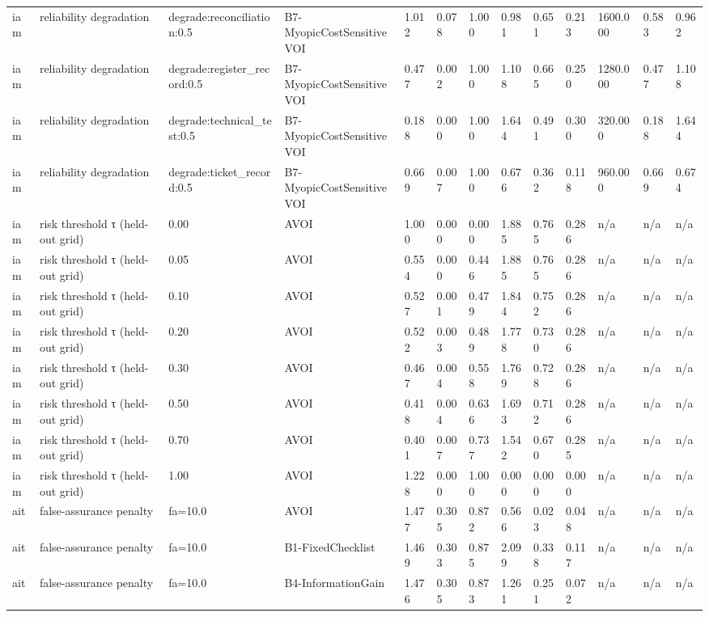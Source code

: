 \begin{table}[!ht]
{\begin{tabular}{lllllllllllll}
iam & reliability degradation & degrade:reconciliation:0.5 & B7-MyopicCostSensitiveVOI & 1.012 & 0.078 & 1.000 & 0.981 & 0.651 & 0.213 & 1600.000 & 0.583 & 0.962 \\
iam & reliability degradation & degrade:register\_record:0.5 & B7-MyopicCostSensitiveVOI & 0.477 & 0.002 & 1.000 & 1.108 & 0.665 & 0.250 & 1280.000 & 0.477 & 1.108 \\
iam & reliability degradation & degrade:technical\_test:0.5 & B7-MyopicCostSensitiveVOI & 0.188 & 0.000 & 1.000 & 1.644 & 0.491 & 0.300 & 320.000 & 0.188 & 1.644 \\
iam & reliability degradation & degrade:ticket\_record:0.5 & B7-MyopicCostSensitiveVOI & 0.669 & 0.007 & 1.000 & 0.676 & 0.362 & 0.118 & 960.000 & 0.669 & 0.674 \\
iam & risk threshold τ (held-out grid) & 0.00 & AVOI & 1.000 & 0.000 & 0.000 & 1.885 & 0.765 & 0.286 & n/a & n/a & n/a \\
iam & risk threshold τ (held-out grid) & 0.05 & AVOI & 0.554 & 0.000 & 0.446 & 1.885 & 0.765 & 0.286 & n/a & n/a & n/a \\
iam & risk threshold τ (held-out grid) & 0.10 & AVOI & 0.527 & 0.001 & 0.479 & 1.844 & 0.752 & 0.286 & n/a & n/a & n/a \\
iam & risk threshold τ (held-out grid) & 0.20 & AVOI & 0.522 & 0.003 & 0.489 & 1.778 & 0.730 & 0.286 & n/a & n/a & n/a \\
iam & risk threshold τ (held-out grid) & 0.30 & AVOI & 0.467 & 0.004 & 0.558 & 1.769 & 0.728 & 0.286 & n/a & n/a & n/a \\
iam & risk threshold τ (held-out grid) & 0.50 & AVOI & 0.418 & 0.004 & 0.636 & 1.693 & 0.712 & 0.286 & n/a & n/a & n/a \\
iam & risk threshold τ (held-out grid) & 0.70 & AVOI & 0.401 & 0.007 & 0.737 & 1.542 & 0.670 & 0.285 & n/a & n/a & n/a \\
iam & risk threshold τ (held-out grid) & 1.00 & AVOI & 1.228 & 0.000 & 1.000 & 0.000 & 0.000 & 0.000 & n/a & n/a & n/a \\
ait & false-assurance penalty & fa=10.0 & AVOI & 1.477 & 0.305 & 0.872 & 0.566 & 0.023 & 0.048 & n/a & n/a & n/a \\
ait & false-assurance penalty & fa=10.0 & B1-FixedChecklist & 1.469 & 0.303 & 0.875 & 2.099 & 0.338 & 0.117 & n/a & n/a & n/a \\
ait & false-assurance penalty & fa=10.0 & B4-InformationGain & 1.476 & 0.305 & 0.873 & 1.261 & 0.251 & 0.072 & n/a & n/a & n/a \\

\end{tabular}}
\end{table}
